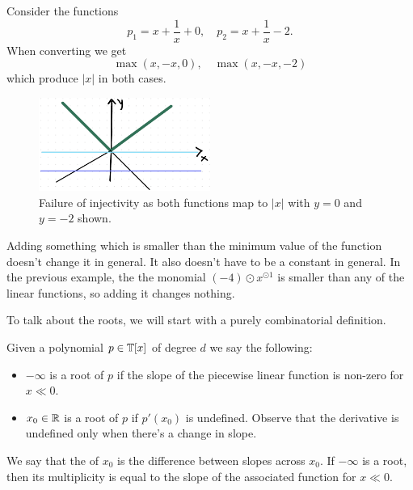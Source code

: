 \documentclass[12pt]{memoir}
\begin{document}
\begin{Ex}
    Consider the functions 
    $$p_1=x+\frac{1}{x}+0,\quad p_2=x+\frac1x-2.$$
    When converting we get 
    $$\max(x,-x,0),\quad\max(x,-x,-2)$$
    which produce $|x|$ in both cases.
    \begin{figure}[h!]
        \centering
        \includegraphics[width=0.5\textwidth]{figs/fig3.2RenzoNotes3.png}
        \caption{Failure of injectivity as both functions map to $|x|$ with $y=0$ and $y=-2$ shown.}
        \label{fig:3.2-InjectivityFailure}
    \end{figure}
    Adding something which is smaller than the minimum value of the function doesn't change it in general. It also doesn't have to be a constant in general. In the previous example, the the monomial $(-4)\odot x^{\odot 1}$ is smaller than any of the linear functions, so adding it changes nothing.
\end{Ex}

To talk about the roots, we will start with a purely combinatorial definition. 

\begin{Def}
    Given a polynomial $p\in\mathbb{T}[x]$ of degree $d$ we say the following:
    \begin{itemize}
        \item $-\infty$ is a root of $p$ if the slope of the piecewise linear function is non-zero for $x\ll 0$.
        \item $x_0\in\mathbb{R}$ is a root of $p$ if $p'(x_0)$ is undefined. Observe that the derivative is undefined only when there's a change in slope.
    \end{itemize}
    We say that the  of $x_0$ is the difference between slopes across $x_0$. If $-\infty$ is a root, then its multiplicity is equal to the slope of the associated function for $x\ll 0$.
\end{Def}
\end{document}
